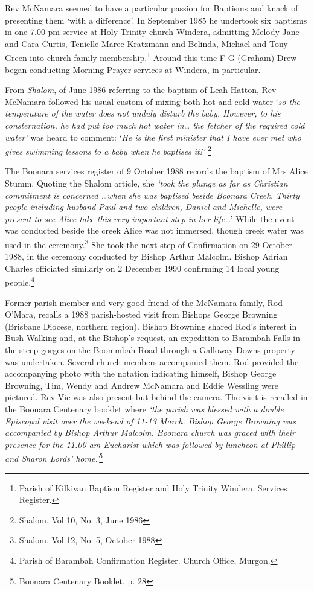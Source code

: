 Rev McNamara seemed to have a particular passion for Baptisms and knack of presenting them `with a difference'. In September 1985 he undertook six baptisms in one 7.00 pm service at Holy Trinity church Windera, admitting Melody Jane and Cara Curtis, Tenielle Maree Kratzmann and Belinda, Michael and Tony Green into church family membership.\footnote{Parish of Kilkivan Baptism Register and Holy Trinity Windera, Services Register.} Around this time F G (Graham) Drew began conducting Morning Prayer services at Windera, in particular.


From \emph{Shalom}, of June 1986 referring to the baptism of Leah Hatton, Rev McNamara followed his usual custom of mixing both hot and cold water `\emph{so the temperature of the water does not unduly disturb the baby. However, to his consternation, he had put too much hot water in\ldots{} the fetcher of the required cold water'} was heard to comment: `\emph{He is the first minister that I have ever met who gives swimming lessons to a baby when he baptises it!'} \footnote{Shalom, Vol 10, No. 3, June 1986}


The Boonara services register of 9 October 1988 records the baptism of Mrs Alice Stumm. Quoting the Shalom article, she \emph{`took the plunge as far as Christian commitment is concerned \ldots when she was baptised beside Boonara Creek. Thirty people including husband Paul and two children, Daniel and Michelle, were present to see Alice take this very important step in her life\ldots{}}' While the event was conducted beside the creek Alice was not immersed, though creek water was used in the ceremony.\footnote{Shalom, Vol 12, No. 5, October 1988} She took the next step of Confirmation on 29 October 1988, in the ceremony conducted by Bishop Arthur Malcolm. Bishop Adrian Charles officiated similarly on 2 December 1990 confirming 14 local young people.\footnote{Parish of Barambah Confirmation Register. Church Office, Murgon.}


Former parish member and very good friend of the McNamara family, Rod O'Mara, recalls a 1988 parish-hosted visit from Bishops George Browning (Brisbane Diocese, northern region). Bishop Browning shared Rod's interest in Bush Walking and, at the Bishop's request, an expedition to Barambah Falls in the steep gorges on the Boonimbah Road through a Galloway Downs property was undertaken. Several church members accompanied them. Rod provided the accompanying photo with the notation indicating himself, Bishop George Browning, Tim, Wendy and Andrew McNamara and Eddie Wessling were pictured. Rev Vic was also present but behind the camera. The visit is recalled in the Boonara Centenary booklet where \emph{`the parish was blessed with a double Episcopal visit over the weekend of 11-13 March. Bishop George Browning was accompanied by Bishop Arthur Malcolm. Boonara church was graced with their presence for the 11.00 am Eucharist which was followed by luncheon at Phillip and Sharon Lords' home.'}\footnote{Boonara Centenary Booklet, p. 28}


